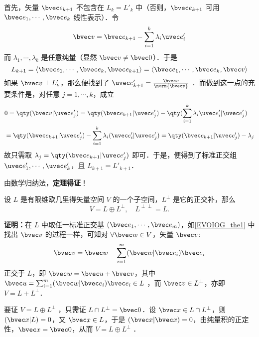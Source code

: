 首先，矢量 $\bvec e_{k+1}$ 不包含在 $L_k=L'_k$ 中（否则，$\bvec e_{k+1}$ 可用 $\bvec e_1,\cdots,\bvec e_k$ 线性表示）．令
\begin{equation}
\bvec v=\bvec e_{k+1}-\sum_{i=1}^{k}\lambda_i\uvec e'_i
\end{equation}
而 $\lambda_1,\cdots,\lambda_k$ 是任意纯量（显然 $\bvec v\neq\bvec 0$）．于是
\begin{equation}
L_{k+1}=\langle\bvec e_1,\cdots,\bvec e_k,\bvec e_{k+1}\rangle=\langle\bvec e_1,\cdots,\bvec e_k,\bvec v\rangle
\end{equation}
如果 $\bvec v\perp L'_k$，那么便找到了 $\uvec e'_{k+1}=\frac{\bvec v}{\norm{\bvec v}}$ ．而做到这一点的充要条件是，对任意 $j=1,\cdots,k$，成立
\begin{equation}
\begin{aligned}
&0=\qty(\bvec v|\uvec e'_j)=\qty(\bvec e_{k+1}|\uvec e'_j)-\qty(\sum_{i=1}^k\lambda_i\uvec e'_i|\uvec e'_j)\\
&=\qty(\bvec e_{k+1}|\uvec e'_j)-\sum_{i=1}^k\lambda_i(\uvec e'_i|\uvec e'_j)=\qty(\bvec e_{k+1}|\uvec e'_j)-\lambda_j
\end{aligned}
\end{equation}
故只需取 $\lambda_j=\qty(\bvec e_{k+1}|\uvec e'_j)$ 即可．于是，便得到了标准正交组 $\uvec e'_1,\cdots,\uvec e'_k$，且 $L_{k+1}=L'_{k+1}$．

由数学归纳法，\textbf{定理得证}！

\begin{theorem}{}\label{EVOIOG_the2}
设 $L$ 是有限维欧几里得矢量空间 $V$ 的一个子空间，$L^{\perp}$ 是它的正交补，那么
\begin{equation}
V=L\oplus L^{\perp},\quad L^{\perp\perp}=L.
\end{equation}
\end{theorem}
\textbf{证明：}在 $L$ 中取任一标准正交基 $(\bvec e_1,\cdots,\bvec e_m)$，如\autoref{EVOIOG_the1} 中找出 $\bvec v$ 的过程一样，可知对 $\forall \bvec w\in V$，矢量 $\bvec v$:
\begin{equation}
\bvec v=\bvec w-\sum_{i=1}^m(\bvec w|\bvec e_i)\bvec e_i
\end{equation}
正交于 $L$，即 $\bvec w=\bvec u+\bvec v$，其中 $\bvec u=\sum_{i=1}^m(\bvec w|\bvec e_i)\bvec e_i\in L$ ，而 $\bvec v\in L^{\perp}$，亦即 $V=L+L^{\perp}$．

要证 $V=L\oplus L^{\perp}$ ，只需证 $L\cap L^{\perp}=\bvec 0$．设 $\bvec x\in L\cap L^{\perp}$，则 $(\bvec x|L)=0$，又 $\bvec x\in L$，于是 $(\bvec x|\bvec x)=0$，由纯量积的正定性，$\bvec x=\bvec 0$，从而 $V=L\oplus L^{\perp}$ ．

